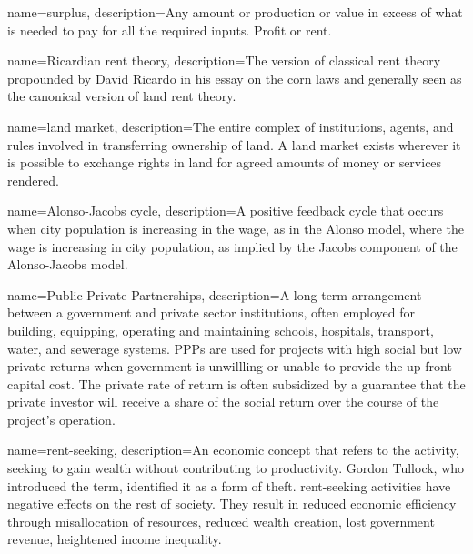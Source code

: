 {
name=surplus,
description={Any amount or production or value in excess of what is needed to pay for all the required inputs. Profit or rent. }
}

{
name=Ricardian rent theory,
description={The version of classical rent theory propounded by David Ricardo in his essay on the corn laws and generally seen as the  canonical version of land rent theory.}
}

{
name=land market,
description={The entire complex of institutions, agents, and rules involved in transferring ownership of land. A land market exists wherever it is possible to exchange rights in land for agreed amounts of money or services rendered.}
}

{
name=Alonso-Jacobs cycle,
description={A positive \gls{feedback} cycle that occurs when city population is increasing in the wage, as in the Alonso model, where the wage is increasing in city population, as implied by the Jacobs component of the \gls{Alonso-Jacobs model}.}
}

{
name=Public-Private Partnerships,
description={A long-term arrangement between a government and private sector institutions, often  employed for building, equipping, operating and maintaining schools, hospitals, transport, water, and sewerage systems. PPPs are used for projects with high social but low private returns when government is unwillling or unable to provide the up-front capital cost. The private rate of return is often subsidized by a guarantee that the private investor will receive a share of the social return over the course of the project's operation.}
}

{
name=rent-seeking,
description={An economic concept that refers to the activity, seeking to gain wealth without contributing to productivity. Gordon Tullock, who introduced  the term, identified it as a form of theft\cite{tullockWelfareCostsTariffs1967}.  %
\Gls{rent-seeking} activities have negative effects on the rest of society. They result in reduced economic efficiency through misallocation of resources, reduced wealth creation, lost government revenue, heightened income inequality.}
}

